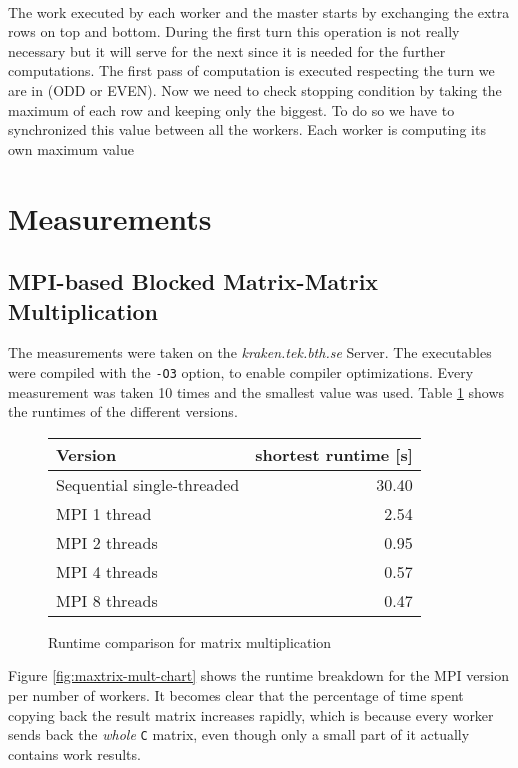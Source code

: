 \documentclass[]{article}
\begin{document}
\paragraph{} The work executed by each worker and the master starts by exchanging the extra rows on top and bottom. During the first turn this operation is not really necessary but it will serve for the next since it is needed for the further computations. The first pass of computation is executed respecting the turn we are in (ODD or EVEN). Now we need to check stopping condition by taking the maximum of each row and keeping only the biggest. To do so we have to synchronized this value between all the workers. Each worker is computing its own maximum value

\section{Measurements}

\subsection{MPI-based Blocked Matrix-Matrix Multiplication}

The measurements were taken on the \emph{kraken.tek.bth.se} Server. The executables were compiled with the \texttt{-O3} option, to enable compiler optimizations. Every measurement was taken 10 times and the smallest value was used. Table \ref{tab:matrix-mult-runtime} shows the runtimes of the different versions.

\begin{figure}
	\centering
	\begin{tabular}{|l|r|}
		\hline
		\textbf{Version} & \textbf{shortest runtime [s]} \\
		\hline
		Sequential single-threaded & 30.40 \\ 
		\hline 
		MPI 1 thread & 2.54 \\ 
		\hline 
		MPI 2 threads & 0.95 \\ 
		\hline 
		MPI 4 threads & 0.57 \\ 
		\hline 
		MPI 8 threads & 0.47 \\ 
		\hline 
	\end{tabular} 
	\caption{Runtime comparison for matrix multiplication}
	\label{tab:matrix-mult-runtime}
\end{figure}

Figure \ref{fig:maxtrix-mult-chart} shows the runtime breakdown for the MPI version per number of workers. It becomes clear that the percentage of time spent copying back the result matrix increases rapidly, which is because every worker sends back the \emph{whole} \texttt{C} matrix, even though only a small part of it actually contains work results.
\end{document}
